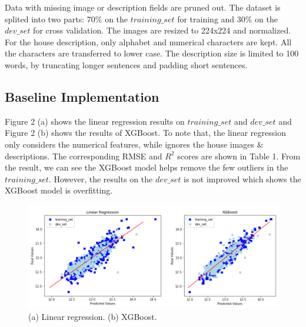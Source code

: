 \documentclass{article} %
\begin{document}
Data with missing image or description fields are pruned out.
The dataset is splited into two parts: 70\% on the $training\_set$ for training
and 30\% on the $dev\_set$ for cross validation.
The images are resized to 224x224 and normalized.
For the house description, only alphabet and numerical characters are kept.
All the characters are transferred to lower case.
The description size is limited to 100 words, 
by truncating longer sentences and padding short sentences.

\subsection{Baseline Implementation}

Figure 2 (a) shows the linear regression results \cite{lr} on $training\_set$ and $dev\_set$
and Figure 2 (b) shows the results of XGBoost\cite{xgboost}.
To note that, the linear regression only considers the numerical features,
while ignores the house images \& descriptions.
The corresponding RMSE and $R^2$ scores are shown in Table 1.
From the result, we can see the XGBoost model helps remove the few outliers in the $training\_set$.
However, the results on the $dev\_set$ is not improved which shows the XGBoost model is overfitting.

\begin{figure}[h]
	\begin{center}
		\includegraphics[width=1\linewidth]{fig/exp.png}
	\end{center}
	\caption{(a) Linear regression. (b) XGBoost.}
	\label{fig:long}
	\label{fig:onecol}
\end{figure}
\end{document}

